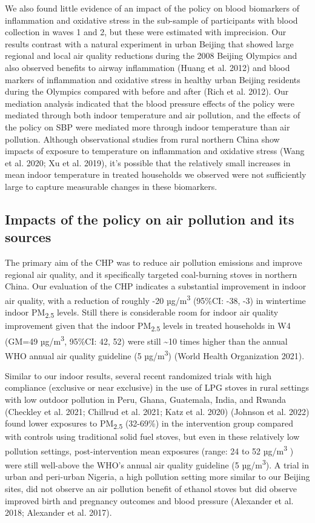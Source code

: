 \documentclass[
  letterpaper,
  DIV=11,
  numbers=noendperiod]{scrartcl}
\begin{document}
We also found little evidence of an impact of the policy on blood
biomarkers of inflammation and oxidative stress in the sub-sample of
participants with blood collection in waves 1 and 2, but these were
estimated with imprecision. Our results contrast with a natural
experiment in urban Beijing that showed large regional and local air
quality reductions during the 2008 Beijing Olympics and also observed
benefits to airway inflammation (Huang et al. 2012) and blood markers of
inflammation and oxidative stress in healthy urban Beijing residents
during the Olympics compared with before and after (Rich et al. 2012).
Our mediation analysis  indicated that the blood pressure
effects of the policy were mediated through both indoor temperature and
air pollution, and the effects of the policy on SBP were mediated more
through indoor temperature than air pollution. Although observational
studies from rural northern China show impacts of exposure to
temperature on inflammation and oxidative stress (Wang et al. 2020; Xu
et al. 2019), it's possible that the relatively small increases in mean
indoor temperature in treated households we observed were not
sufficiently large to capture measurable changes in these biomarkers.

\subsection{Impacts of the policy on air pollution and its
sources}\label{impacts-of-the-policy-on-air-pollution-and-its-sources}

The primary aim of the CHP was to reduce air pollution emissions and
improve regional air quality, and it specifically targeted coal-burning
stoves in northern China. Our evaluation of the CHP indicates a
substantial improvement in indoor air quality, with a reduction of
roughly -20 µg/m\textsuperscript{3} (95\%CI: -38, -3) in wintertime
indoor PM\textsubscript{2.5} levels. Still there is considerable room
for indoor air quality improvement given that the indoor
PM\textsubscript{2.5} levels in treated households in W4 (GM=49
µg/m\textsuperscript{3}, 95\%CI: 42, 52) were still \textasciitilde10
times higher than the annual WHO annual air quality guideline (5
µg/m\textsuperscript{3}) (World Health Organization 2021).

Similar to our indoor results, several recent randomized trials with
high compliance (exclusive or near exclusive) in the use of LPG stoves
in rural settings with low outdoor pollution in Peru, Ghana, Guatemala,
India, and Rwanda (Checkley et al. 2021; Chillrud et al. 2021; Katz et
al. 2020) (Johnson et al. 2022) found lower exposures to
PM\textsubscript{2.5} (32-69\%) in the intervention group compared with
controls using traditional solid fuel stoves, but even in these
relatively low pollution settings, post-intervention mean exposures
(range: 24 to 52 µg/m\textsuperscript{3} ) were still well-above the
WHO's annual air quality guideline (5 µg/m\textsuperscript{3}). A trial
in urban and peri-urban Nigeria, a high pollution setting more similar
to our Beijing sites, did not observe an air pollution benefit of
ethanol stoves but did observe improved birth and pregnancy outcomes and
blood pressure (Alexander et al. 2018; Alexander et al. 2017).
\end{document}
